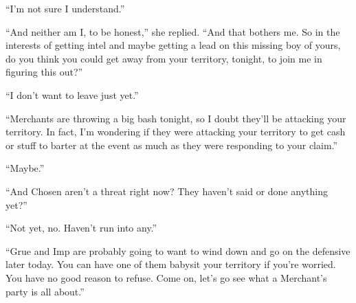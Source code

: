 ``I'm not sure I understand.''



``And neither am I, to be honest,'' she replied.  ``And that bothers me.  So in the interests of getting intel and maybe getting a lead on this missing boy of yours, do you think you could get away from your territory, tonight, to join me in figuring this out?''



``I don't want to leave just yet.''



``Merchants are throwing a big bash tonight, so I doubt they'll be attacking your territory.  In fact, I'm wondering if they were attacking your territory to get cash or stuff to barter at the event as much as they were responding to your claim.''



``Maybe.''



``And Chosen aren't a threat right now?  They haven't said or done anything yet?''



``Not yet, no.  Haven't run into any.''



``Grue and Imp are probably going to want to wind down and go on the defensive later today.  You can have one of them babysit your territory if you're worried.  You have no good reason to refuse.  Come on, let's go see what a Merchant's party is all about.''





